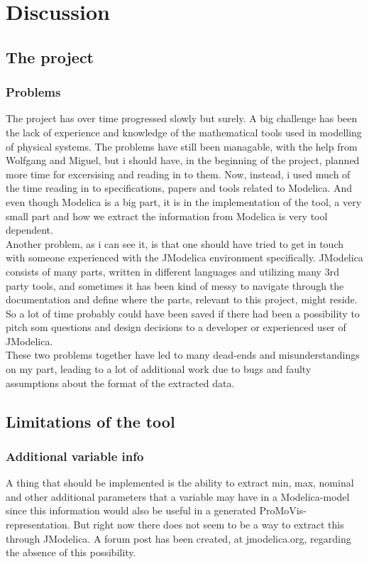 \section{Discussion}
\subsection{The project}
\subsubsection{Problems}
The project has over time progressed slowly but surely. A big challenge has been the lack of experience and knowledge of the mathematical tools used in modelling of physical systems. The problems have still been managable, with the help from Wolfgang and Miguel, but i should have, in the beginning of the project, planned more time for excersising and reading in to them. Now, instead, i used much of the time reading in to specifications, papers and tools related to Modelica. And even though Modelica is a big part, it is in the implementation of the tool, a very small part and how we extract the information from Modelica is very tool dependent.\\\newline Another problem, as i can see it, is that one should have tried to get in touch with someone experienced with the JModelica environment specifically. JModelica consists of many parts, written in different languages and utilizing many 3rd party tools, and sometimes it has been kind of messy to navigate through the documentation and define where the parts, relevant to this project, might reside. So a lot of time probably could have been saved if there had been a possibility to pitch som questions and design decisions to a developer or experienced user of JModelica.\\\newline These two problems together have led to many dead-ends and misunderstandings on my part, leading to a lot of additional work due to bugs and faulty assumptions about the format of the extracted data.
\subsection{Limitations of the tool}
\subsubsection{Additional variable info}
A thing that should be implemented is the ability to extract min, max, nominal and other additional parameters that a variable may have in a Modelica-model since this information would also be useful in a generated ProMoVis-representation. But right now there does not seem to be a way to extract this through JModelica. A forum post has been created, at jmodelica.org, regarding the absence of this possibility.
